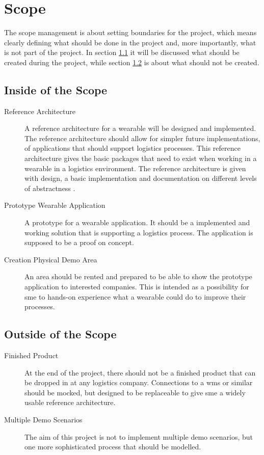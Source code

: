 \chapter{Scope}\label{cha:scope}
The scope management is about setting boundaries for the project, which means clearly defining what should be done in the project and, more importantly, what is not part of the project. In section \ref{sec:insideScope} it will be discussed what should be created during the project, while section \ref{sec:outsideScope} is about what should not be created.

\section{Inside of the Scope}\label{sec:insideScope}
\begin{description}
	\item[Reference Architecture] \hfill
	
	A reference architecture for a wearable will be designed and implemented. The reference architecture should allow for simpler future implementations, of applications that should support logistics processes. This reference architecture gives the basic packages that need to exist when working in a wearable in a logistics environment. The reference architecture is given with design, a basic implementation and documentation on different levels of abstractness \cite{Kruchten:1995}.
	\item[Prototype Wearable Application] \hfill
	
	A prototype for a wearable application. It should be a implemented and working solution that is supporting a logistics process. The application is supposed to be a proof on concept.
	\item[Creation Physical Demo Area] \hfill
	
	An area should be rented and prepared to be able to show the prototype application to interested companies. This is intended as a possibility for \gls{sme} to hands-on experience what a wearable could do to improve their processes.
\end{description}

\section{Outside of the Scope}\label{sec:outsideScope}
\begin{description}
	\item[Finished Product] \hfill
	
	At the end of the project, there should not be a finished product that can be dropped in at any logistics company. Connections to a \gls{wms} or similar should be mocked, but designed to be replaceable to give \gls{sme} a widely usable reference architecture.
	\item[Multiple Demo Scenarios] \hfill
	
	The aim of this project is not to implement multiple demo scenarios, but one more sophisticated process that should be modelled. 
\end{description}
